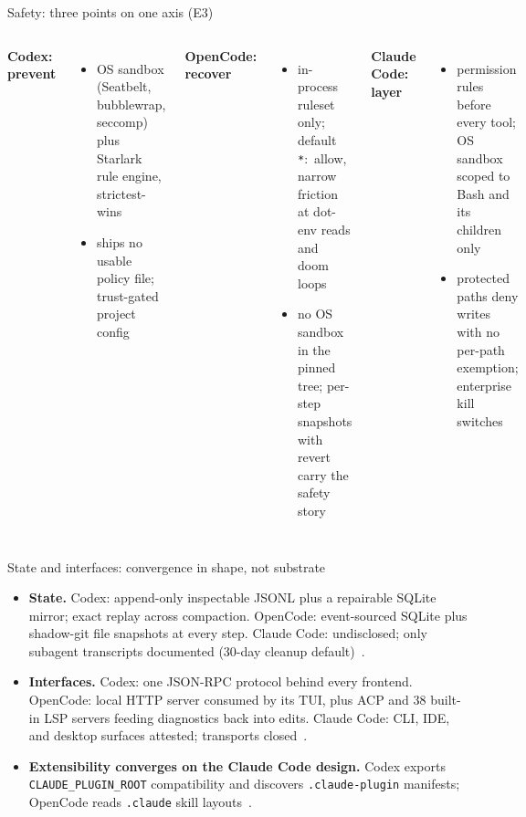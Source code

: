 \documentclass[aspectratio=169,11pt]{beamer}
\newcommand{\codex}[0]{Codex}
\newcommand{\occ}[0]{OpenCode}
\newcommand{\ccc}[0]{Claude Code}
\begin{document}
\begin{frame}{Safety: three points on one axis (E3)}
  \footnotesize
  \begin{columns}[T]
      \textbf{\codex{}: prevent}
      \begin{itemize}
        \item OS sandbox (Seatbelt, bubblewrap, seccomp) plus Starlark
          rule engine, strictest-wins~\citep{codexRepo,codexDocsSandboxing}
        \item ships no usable policy file; trust-gated project config
      \end{itemize}
      \textbf{\occ{}: recover}
      \begin{itemize}
        \item in-process ruleset only; default \texttt{*}:~allow, narrow
          friction at dot-env reads and doom loops~\citep{opencodeRepo}
        \item no OS sandbox in the pinned tree; per-step snapshots with
          revert carry the safety story
      \end{itemize}
      \textbf{\ccc{}: layer}
      \begin{itemize}
        \item permission rules before every tool; OS sandbox scoped to
          Bash and its children only~\citep{claudeCodeDocsPermissions,claudeCodeDocsSandboxing}
        \item protected paths deny writes with no per-path exemption;
          enterprise kill switches
      \end{itemize}
  \end{columns}
\end{frame}

\begin{frame}{State and interfaces: convergence in shape, not substrate}
  \begin{itemize}
    \item \textbf{State.} \codex{}: append-only inspectable JSONL plus a
      repairable SQLite mirror; exact replay across compaction. \occ{}:
      event-sourced SQLite plus shadow-git file snapshots at every step.
      \ccc{}: undisclosed; only subagent transcripts documented (30-day
      cleanup default)~\citep{codexRepo,opencodeRepo,claudeCodeDocsSubagents}.
    \item \textbf{Interfaces.} \codex{}: one JSON-RPC protocol behind
      every frontend. \occ{}: local HTTP server consumed by its TUI,
      plus ACP and 38 built-in LSP servers feeding diagnostics back into
      edits. \ccc{}: CLI, IDE, and desktop surfaces attested; transports
      closed~\citep{codexRepo,opencodeRepo,claudeCodeDocsPermissions}.
    \item \textbf{Extensibility converges on the \ccc{} design.}
      \codex{} exports \texttt{CLAUDE\_PLUGIN\_ROOT} compatibility and
      discovers \texttt{.claude-plugin} manifests; \occ{} reads
      \texttt{.claude} skill layouts~\citep{codexRepo,opencodeRepo}.
  \end{itemize}
\end{frame}
\end{document}
